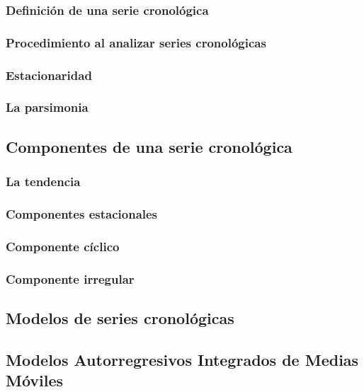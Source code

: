 \documentclass[
]{article}
\begin{document}
\subsubsection{Definición de una serie cronológica}

\subsubsection{Procedimiento al analizar series cronológicas}

\subsubsection{Estacionaridad}

\subsubsection{La parsimonia}

\subsection{Componentes de una serie cronológica}

\subsubsection{La tendencia}

\subsubsection{Componentes estacionales}

\subsubsection{Componente cíclico}

\subsubsection{Componente irregular}

\subsection{Modelos de series cronológicas}

\subsection{Modelos Autorregresivos Integrados de Medias Móviles}
\end{document}
